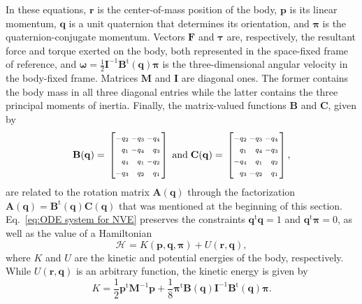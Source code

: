 \documentclass[
	aip,
	jcp,
	reprint,
]{revtex4-1}
\makeatletter
\newcommand{\mt}[1]{\boldsymbol{\mathbf{#1}}}          %
\newcommand{\vt}[1]{\boldsymbol{\mathbf{#1}}}          %
\newcommand{\tr}[1]{#1^\text{t}}                       %
\newcommand{\Ham}[1]{{\mathcal H}_\text{#1}}           %
\newenvironment{smallarray}[1]                          %
{
	\null\,\vcenter\bgroup\scriptsize
	\renewcommand{\arraystretch}{1.5}
	\arraycolsep=.13885em
	\hbox\bgroup$\left[\array{@{}#1@{}}}
	{\endarray\right]$\egroup\egroup\,\null
}
\makeatother
\begin{document}
In these equations, $\vt r$ is the center-of-mass position of the body, $\vt p$ is its linear momentum, $\vt q$ is a unit quaternion that determines its orientation, and $\vt \pi$ is the quaternion-conjugate momentum.
Vectors $\vt F$ and $\vt \tau$ are, respectively, the resultant force and torque exerted on the body, both represented in the space-fixed frame of reference, and $\vt \omega = \frac{1}{2} {\mt I}^{-1} \tr{\mt B}(\vt q) {\vt \pi}$ is the three-dimensional angular velocity in the body-fixed frame.
Matrices $\mt M$ and $\mt I$ are diagonal ones.
The former contains the body mass in all three diagonal entries while the latter contains the three principal moments of inertia.
Finally, the matrix-valued functions $\mt B$ and $\vt C$, given by
\begin{equation*}
\label{eq:def_B_and_C}
\mt B(\vt q) = \begin{smallarray}{rrrr}
-q_2 & -q_3 & -q_4 \\
 q_1 & -q_4 &  q_3 \\
 q_4 &  q_1 & -q_2 \\
-q_3 &  q_2 &  q_1
\end{smallarray}
%
\; \text{and} \;
%
\mt C(\vt q) = \begin{smallarray}{rrrr}
-q_2 & -q_3 & -q_4 \\
 q_1 &  q_4 & -q_3 \\
-q_4 &  q_1 &  q_2 \\
 q_3 & -q_2 &  q_1
\end{smallarray},
\end{equation*}
are related to the rotation matrix ${\mt A}(\vt q)$ through the factorization ${\mt A}(\vt q) = \tr{\mt B}(\vt q) {\mt C}(\vt q)$ that was mentioned at the beginning of this section. Eq.~\eqref{eq:ODE system for NVE} preserves the constraints $\tr{\vt q}{\vt q} = 1$ and $\tr{\vt q}{\vt \pi} = 0$, as well as the value of a Hamiltonian
\begin{equation}
\label{eq:Hamiltonian}
\Ham{} = K(\vt p, \vt q, \vt \pi) + U(\vt r,\vt q),
\end{equation}
where $K$ and $U$ are the kinetic and potential energies of the body, respectively.
While $U(\vt r, \vt q)$ is an arbitrary function, the kinetic energy is given by
\begin{equation}
\label{eq:kinetic energy}
K = \frac{1}{2} \tr{\vt p} {\mt M}^{-1} {\vt p} + \frac{1}{8} \tr{\vt \pi} {\mt B}(\vt q) {\mt I}^{-1} \tr{\mt B}(\vt q) {\vt \pi}.
\end{equation}
\end{document}
